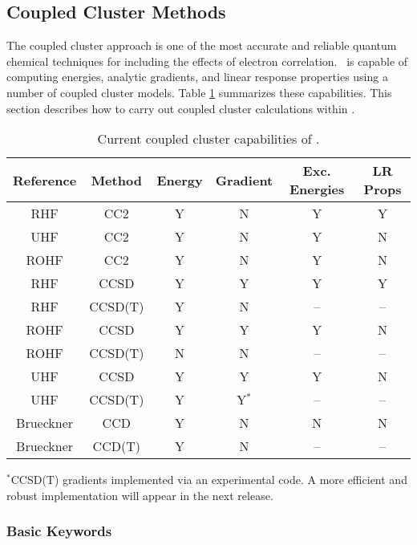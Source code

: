 \subsection{Coupled Cluster Methods} \label{cc}

The coupled cluster approach is one of the most accurate and reliable quantum
chemical techniques for including the effects of electron correlation.
\PSIthree\ is capable of computing energies, analytic gradients, and
linear response properties using a number of coupled cluster models.
Table \ref{table:ccsummary} summarizes these capabilities.  This section
describes how to carry out coupled cluster calculations within \PSIthree.
\begin{table}[h]
\begin{center}
\caption{Current coupled cluster capabilities of \PSIthree.}
\label{table:ccsummary}
\begin{tabular}{cccccc}
\hline
\hline
Reference & Method & Energy    & Gradient  &  Exc. Energies & LR Props \\
\hline
RHF       & CC2     & Y & N & Y & Y  \\
UHF       & CC2     & Y & N & Y & N  \\
ROHF      & CC2     & Y & N & Y & N  \\
RHF       & CCSD    & Y & Y & Y & Y  \\
RHF       & CCSD(T) & Y & N & --& -- \\
ROHF      & CCSD    & Y & Y & Y & N  \\
ROHF      & CCSD(T) & N & N & --& -- \\
UHF       & CCSD    & Y & Y & Y & N  \\
UHF       & CCSD(T) & Y & Y$^*$ & --& -- \\
Brueckner & CCD     & Y & N & N & N  \\
Brueckner & CCD(T)  & Y & N & --& -- \\
\hline
\hline
\end{tabular}
\end{center}
{\footnotesize $^*$CCSD(T) gradients implemented via an experimental code.
A more efficient and robust implementation will appear in the next
release.}
\end{table}

\subsubsection{Basic Keywords}

